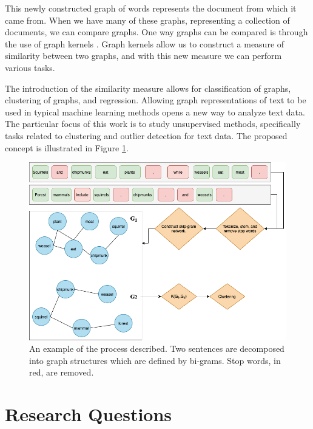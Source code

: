 \documentclass[11pt]{report}
\begin{document}
This newly constructed graph of words represents the document from which it came from. When we have many of these graphs, representing a collection of documents, we can compare graphs. One way graphs can be compared is through the use of graph kernels \cite{kriege2020survey}. Graph kernels allow us to construct a measure of similarity between two graphs, and with this new measure we can perform various tasks.

The introduction of the similarity measure allows for classification of graphs, clustering of graphs, and regression. Allowing graph representations of text to be used in typical machine learning methods opens a new way to analyze text data. The particular focus of this work is to study unsupervised methods, specifically tasks related to clustering and outlier detection for text data. The proposed concept is illustrated in Figure \ref{fig:diagram}. \\


\begin{figure}[ht]
\centering

\includegraphics[width = \textwidth]{../../Images/proposal_diagram.png}
\caption{An example of the process described. Two sentences are decomposed into graph structures which are defined by bi-grams. Stop words, in red, are removed.}
\label{fig:diagram}
\end{figure}


\section{Research Questions}
\end{document}
